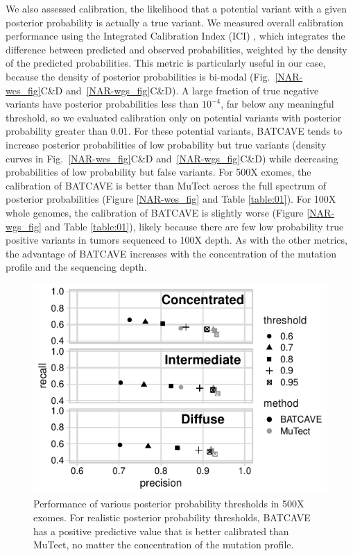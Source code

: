 \documentclass[a4,center,fleqn]{NAR}
\newcommand{\batcave}{BATCAVE\xspace}
\begin{document}
We also assessed calibration, the likelihood that a potential variant with a given posterior probability is actually a true variant.
We measured overall calibration performance using the Integrated Calibration Index (ICI) \cite{Austin2019}, which integrates the difference between predicted and observed probabilities, weighted by the density of the predicted probabilities.
This metric is particularly useful in our case, because the density of posterior probabilities is bi-modal (Fig.~\ref{NAR-wes_fig}C\&D and~\ref{NAR-wgs_fig}C\&D).
A large fraction of true negative variants have posterior probabilities less than $10^{-4}$, far below any meaningful threshold, so we evaluated calibration only on potential variants with posterior probability greater than 0.01.
For these potential variants, \batcave tends to increase posterior probabilities of low probability but true variants (density curves in Fig.~\ref{NAR-wes_fig}C\&D and~\ref{NAR-wgs_fig}C\&D) while decreasing probabilities of low probability but false variants.
For 500X exomes, the calibration of \batcave is better than MuTect across the full spectrum of posterior probabilities (Figure \ref{NAR-wes_fig} and Table \ref{table:01}).
For 100X whole genomes, the calibration of \batcave is slightly worse (Figure \ref{NAR-wgs_fig} and Table \ref{table:01}), likely because there are few low probability true positive variants in tumors sequenced to 100X depth. 
As with the other metrics, the advantage of \batcave increases with the concentration of the mutation profile and the sequencing depth.

\begin{figure}
  \begin{center}
  \includegraphics{figures/ppv_wes.pdf}
  \end{center}
  \caption{Performance of various posterior probability thresholds in 500X exomes. 
  For realistic posterior probability thresholds,  \batcave has a positive predictive value that is better calibrated than MuTect, no matter the concentration of the mutation profile.
  }
\label{NAR-ppv_fig}
\end{figure}
\end{document}
